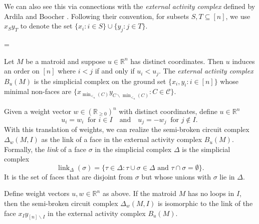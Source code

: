 \documentclass[ALCO,ThmDefs,Unicode,epreuves]{cedram}
\newcommand{\R}{\mathbb{R}}
\newcommand{\CC}{\mathcal{C}}
\DeclareMathOperator{\link}{link}
\begin{document}
We can also see this via connections with the \emph{external activity complex} defined by Ardila and Boocher \cite{AB16}.
Following their convention, for subsets $S,T\subseteq [n]$, we use $x_Sy_T$ to denote the set $\{x_i:i\in S\}\cup \{y_j:j\in T\}$.

\newbox\toto
\setbox\toto=\hbox{\cite[Theorem~1.9]{AB16}}
\begin{defi}[\box\toto]
Let $M$ be a matroid and suppose $u\in \R^n$ has distinct coordinates. Then $u$ induces an order on $[n]$ where $i<j$ if and only if $u_i<u_j$. 
The \emph{external activity complex} $B_u(M)$ is the
simplicial complex on the ground set $\{x_i,y_i:i\in [n]\}$ whose minimal non-faces 
are $\{x_{\min_{<_u}(C)}y_{C\backslash \min_{<_u}(C)}: C\in \CC \}$.
\end{defi}

Given a weight vector $w\in (\R_{\geq 0})^n$ with distinct coordinates, define $u\in \R^n$ 
\[
u_i = w_i \ \text{ for }i\in I \quad \text{and}\quad u_j = -w_j \ \text{ for }j\not\in I. \ 
\]
With this translation of weights, we can realize the semi-broken circuit complex $\Delta_w(M,I)$ as 
the link of a face in the external activity complex $B_u(M)$. 
Formally, the \emph{link} of a face $\sigma$ in the simplicial complex
 $\Delta$ is the simplicial complex
 \[
 \link_{\Delta}(\sigma)=\{\tau \in \Delta : \tau \cup \sigma
 \in \Delta \text{ and } \tau \cap \sigma =\emptyset \}.
 \]
It is the set of faces that are disjoint from $\sigma$ but whose unions with
$\sigma$ lie in $\Delta$. 


\begin{prop} Define weight vectors $u,w\in \R^n$ as above. If the matroid $M$ has no loops in $I$, then 
the semi-broken circuit complex $\Delta_w(M,I)$ is isomorphic to the link of 
the face $x_Iy_{[n]\backslash I}$ in the external activity
complex $B_u(M)$.
\end{prop}
\end{document}
